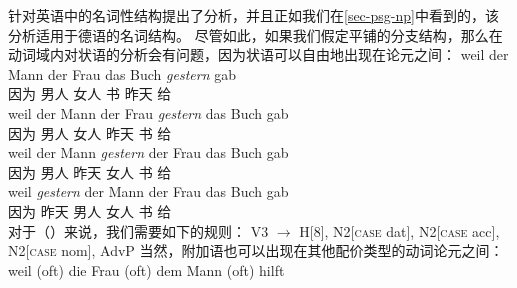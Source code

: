 \citet[]{GKPS85a}针对英语中的名词性结构提出了\xbarc 分析，并且正如我们在\ref{sec-psg-np}中看到的，该分析适用于德语的名词结构。
尽管如此，如果我们假定平铺的分支结构，那么在动词域内对状语的分析会有问题，因为状语可以自由地出现在论元之间：
\eal
\ex 
\gll weil der Mann der Frau das Buch \emph{gestern} gab\\
	 因为  男人  女人  书 昨天 给\\
\ex 
\gll weil der Mann der Frau \emph{gestern} das Buch gab\\
	 因为  男人  女人 昨天  书 给\\
\ex 
\gll weil der Mann \emph{gestern} der Frau das Buch gab\\
	 因为  男人 昨天  女人  书 给\\
\ex 
\gll weil \emph{gestern} der Mann der Frau das Buch gab\\
	 因为 昨天  男人  女人  书 给\\
\zl
对于（）来说，我们需要如下的规则：
\ea
\label{regel-ditransitiv-adv}
V3  $\to$ H[8], N2[\textsc{case} dat], N2[\textsc{case} acc], N2[\textsc{case} nom], AdvP
\z
当然，附加语也可以出现在其他配价类型的动词论元之间：
\ea
\gll weil (oft) die Frau (oft) dem Mann (oft) hilft\\

